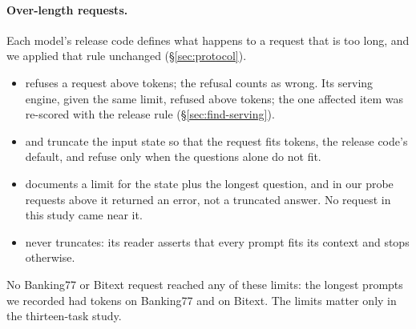 \paragraph{Over-length requests.} Each model's release code defines what happens to a request that is too long,
and we applied that rule unchanged (\S\ref{sec:protocol}).
\begin{itemize}
  \item \pplx{} refuses a request above \dtLimitPplxRelease{} tokens; the refusal counts as wrong. Its serving
  engine, given the same limit, refused above \dtLimitPplxServed{} tokens; the one affected item was re-scored
  with the release rule (\S\ref{sec:find-serving}).
  \item \clef{} and \flash{} truncate the input state so that the request fits \dtLimitClefRelease{} tokens, the
  release code's default, and refuse only when the questions alone do not fit.
  \item \jev{} documents a limit for the state plus the longest question, and in our probe requests above it returned an
  error, not a truncated answer. No \jev{} request in this study came near it.
  \item \orb{} never truncates: its reader asserts that every prompt fits its context and stops otherwise.
\end{itemize}
No Banking77 or Bitext request reached any of these limits: the longest prompts we recorded had
\psMaxPromptTokens{} tokens on Banking77 and \btMaxPromptTokens{} on Bitext. The limits matter only in the thirteen-task study.
